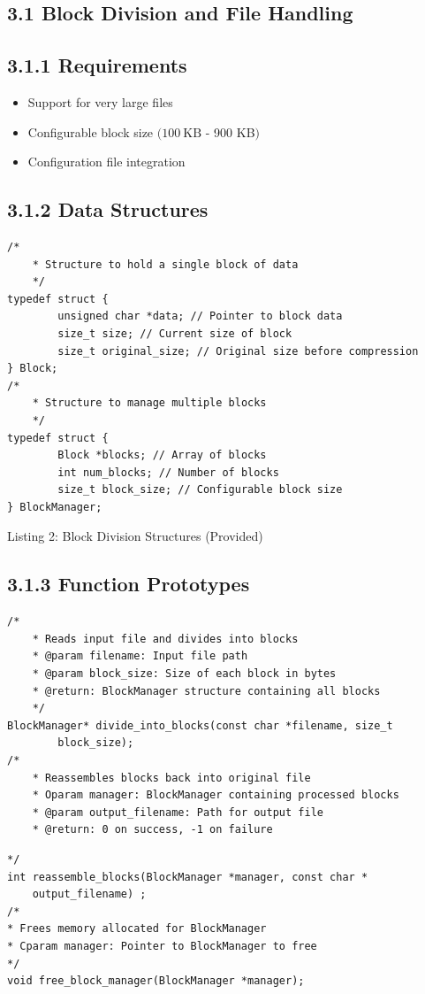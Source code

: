 \documentclass[10pt]{article}
\begin{document}
\subsection*{3.1 Block Division and File Handling}
\subsection*{3.1.1 Requirements}
\begin{itemize}
  \item Support for very large files
  \item Configurable block size $(100 \mathrm{~KB}$ - 900 KB$)$
  \item Configuration file integration
\end{itemize}

\subsection*{3.1.2 Data Structures}
\begin{verbatim}
/*
    * Structure to hold a single block of data
    */
typedef struct {
        unsigned char *data; // Pointer to block data
        size_t size; // Current size of block
        size_t original_size; // Original size before compression
} Block;
/*
    * Structure to manage multiple blocks
    */
typedef struct {
        Block *blocks; // Array of blocks
        int num_blocks; // Number of blocks
        size_t block_size; // Configurable block size
} BlockManager;
\end{verbatim}

Listing 2: Block Division Structures (Provided)

\subsection*{3.1.3 Function Prototypes}
\begin{verbatim}
/*
    * Reads input file and divides into blocks
    * @param filename: Input file path
    * @param block_size: Size of each block in bytes
    * @return: BlockManager structure containing all blocks
    */
BlockManager* divide_into_blocks(const char *filename, size_t
        block_size);
/*
    * Reassembles blocks back into original file
    * Oparam manager: BlockManager containing processed blocks
    * @param output_filename: Path for output file
    * @return: 0 on success, -1 on failure
\end{verbatim}

\begin{verbatim}
*/
int reassemble_blocks(BlockManager *manager, const char *
    output_filename) ;
/*
* Frees memory allocated for BlockManager
* Cparam manager: Pointer to BlockManager to free
*/
void free_block_manager(BlockManager *manager);
\end{verbatim}
\end{document}
